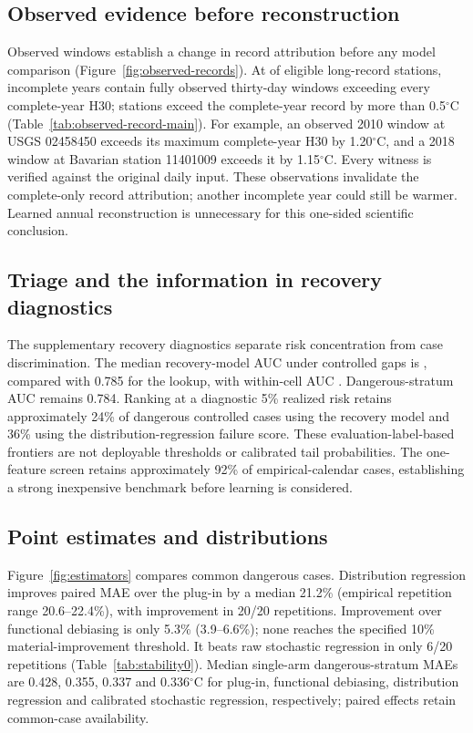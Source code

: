 \documentclass[draft,linenumbers]{agujournal2025}
\begin{document}
\subsection{Observed evidence before reconstruction}

Observed windows establish a change in record attribution before any model comparison (Figure~\ref{fig:observed-records}). At \RRecordStations{} of \RRecordDenominator{} eligible long-record stations, \RRecordStationYears{} incomplete years contain fully observed thirty-day windows exceeding every complete-year H30; \RRecordHalfStations{} stations exceed the complete-year record by more than 0.5$^{\circ}$C (Table~\ref{tab:observed-record-main}). For example, an observed 2010 window at USGS 02458450 exceeds its maximum complete-year H30 by 1.20$^{\circ}$C, and a 2018 window at Bavarian station 11401009 exceeds it by 1.15$^{\circ}$C. Every witness is verified against the original daily input. These observations invalidate the complete-only record attribution; another incomplete year could still be warmer. Learned annual reconstruction is unnecessary for this one-sided scientific conclusion.



\subsection{Triage and the information in recovery diagnostics}
The supplementary recovery diagnostics separate risk concentration from case discrimination. The median recovery-model AUC under controlled gaps is \RRecoveryAUC{}, compared with 0.785 for the lookup, with within-cell AUC \RWithinAUC{}. Dangerous-stratum AUC remains 0.784. Ranking at a diagnostic 5\% realized risk retains approximately 24\% of dangerous controlled cases using the recovery model and 36\% using the distribution-regression failure score. These evaluation-label-based frontiers are not deployable thresholds or calibrated tail probabilities. The one-feature screen retains approximately 92\% of empirical-calendar cases, establishing a strong inexpensive benchmark before learning is considered.

\subsection{Point estimates and distributions}
Figure~\ref{fig:estimators} compares common dangerous cases. Distribution regression improves paired MAE over the plug-in by a median 21.2\% (empirical repetition range 20.6--22.4\%), with improvement in 20/20 repetitions. Improvement over functional debiasing is only 5.3\% (3.9--6.6\%); none reaches the specified 10\% material-improvement threshold. It beats raw stochastic regression in only 6/20 repetitions (Table~\ref{tab:stability0}). Median single-arm dangerous-stratum MAEs are 0.428, 0.355, 0.337 and 0.336$^{\circ}$C for plug-in, functional debiasing, distribution regression and calibrated stochastic regression, respectively; paired effects retain common-case availability.
\end{document}
